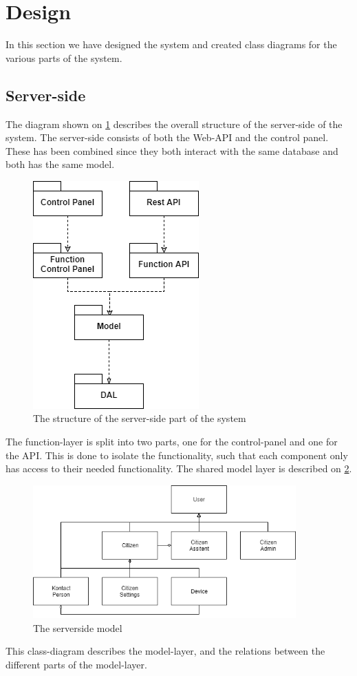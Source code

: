 \section{Design}
In this section we have designed the system and created class diagrams for the various parts of the system.

\subsection{Server-side}
The diagram shown on \ref{fig:serversidestructure} describes the overall structure of the server-side of the system. The server-side consists of both the Web-API and the control panel. These has been combined since they both interact with the same database and both has the same model. 

\begin{figure}[H]
    \centering
    \includegraphics{Figures/serverSide.png}
    \caption{The structure of the server-side part of the system}
    \label{fig:serversidestructure}
\end{figure}

The function-layer is split into two parts, one for the control-panel and one for the API. This is done to isolate the functionality, such that each component only has access to their needed functionality. The shared model layer is described on \ref{fig:serversidemodel}.

\begin{figure}[H]
    \centering 
    \includegraphics[width=0.9\textwidth] {Figures/serverSidemodel.png}
    \caption{The serverside model}
    \label{fig:serversidemodel}
\end{figure}
This class-diagram describes the model-layer, and the relations between the different parts of the model-layer.

